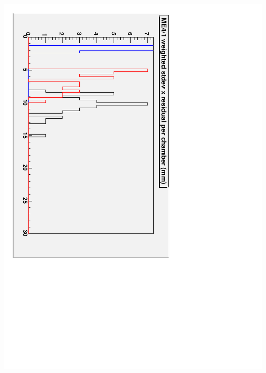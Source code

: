 \documentclass[compress]{beamer}
\begin{document}
\begin{frame}
\begin{columns}
\includegraphics[height=\linewidth, angle=90]{stdevs_me41.pdf}
\end{columns}

\label{numpages}
\end{frame}
\end{document}
